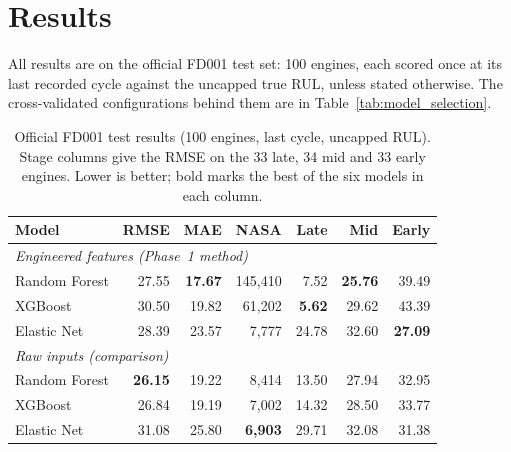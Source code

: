 
\section{Results}
\label{sec:results}

All results are on the official FD001 test set: 100 engines, each scored once at
its last recorded cycle against the uncapped true RUL, unless stated otherwise.
The cross-validated configurations behind them are in
Table~\ref{tab:model_selection}.

\begin{table}[!t]
\centering
\caption{Official FD001 test results (100 engines, last cycle, uncapped RUL).
Stage columns give the RMSE on the 33 late, 34 mid and 33 early engines. Lower
is better; bold marks the best of the six models in each column.}
\label{tab:test_results}
\setlength{\tabcolsep}{4pt}
\begin{tabular}{lrrrrrr}
\hline
Model & RMSE & MAE & NASA & Late & Mid & Early \\
\hline
\multicolumn{7}{l}{\emph{Engineered features (Phase~1 method)}} \\
Random Forest & 27.55 & \textbf{17.67} & 145{,}410 & 7.52 & \textbf{25.76} & 39.49 \\
XGBoost       & 30.50 & 19.82 & 61{,}202  & \textbf{5.62} & 29.62 & 43.39 \\
Elastic Net   & 28.39 & 23.57 & 7{,}777   & 24.78 & 32.60 & \textbf{27.09} \\
\hline
\multicolumn{7}{l}{\emph{Raw inputs (comparison)}} \\
Random Forest & \textbf{26.15} & 19.22 & 8{,}414 & 13.50 & 27.94 & 32.95 \\
XGBoost       & 26.84 & 19.19 & 7{,}002 & 14.32 & 28.50 & 33.77 \\
Elastic Net   & 31.08 & 25.80 & \textbf{6{,}903} & 29.71 & 32.08 & 31.38 \\
\hline
\end{tabular}
\end{table}

